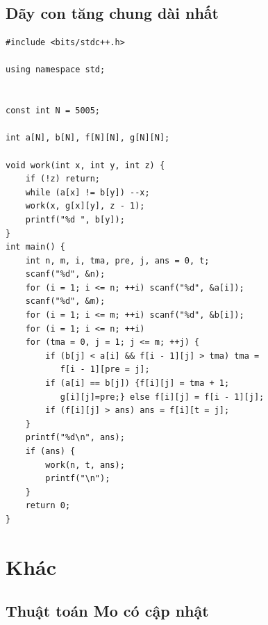 \documentclass[11pt]{article}
\begin{document}
\subsection{Dãy con tăng chung dài nhất}

\begingroup
\footnotesize
\begin{verbatim}
#include <bits/stdc++.h>

using namespace std;


const int N = 5005;

int a[N], b[N], f[N][N], g[N][N];

void work(int x, int y, int z) {
    if (!z) return;
    while (a[x] != b[y]) --x;
    work(x, g[x][y], z - 1);
    printf("%d ", b[y]);
}
int main() {
    int n, m, i, tma, pre, j, ans = 0, t;
    scanf("%d", &n);
    for (i = 1; i <= n; ++i) scanf("%d", &a[i]);
    scanf("%d", &m);
    for (i = 1; i <= m; ++i) scanf("%d", &b[i]);
    for (i = 1; i <= n; ++i)
    for (tma = 0, j = 1; j <= m; ++j) {
        if (b[j] < a[i] && f[i - 1][j] > tma) tma =
           f[i - 1][pre = j];
        if (a[i] == b[j]) {f[i][j] = tma + 1;
           g[i][j]=pre;} else f[i][j] = f[i - 1][j];
        if (f[i][j] > ans) ans = f[i][t = j];
    }
    printf("%d\n", ans);
    if (ans) {
        work(n, t, ans);
        printf("\n");
    }
    return 0;
}
\end{verbatim}
\endgroup

\section{Khác}

\subsection{Thuật toán Mo có cập nhật}
\end{document}
